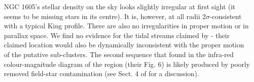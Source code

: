 \documentclass[RNAAS]{aastex631}
\begin{document}
NGC 1605's stellar density on the sky looks slightly irregular at first sight (it seems to be missing stars in its centre). It is, however, at all radii 2$\sigma$-consistent with a typical King profile. There are also no irregularities in proper motion or in parallax space. We find no evidence for the tidal streams claimed by \citet{Camargo2021} - their claimed location would also be dynamically inconsistent with the proper motion of the putative sub-clusters.
The second sequence that \citet{Camargo2021} found in the infra-red colour-magnitude diagram of the region (their Fig. 6) is likely produced by poorly removed field-star contamination (see Sect. 4 of \citealt{CantatAnders2020} for a discussion).
\end{document}
